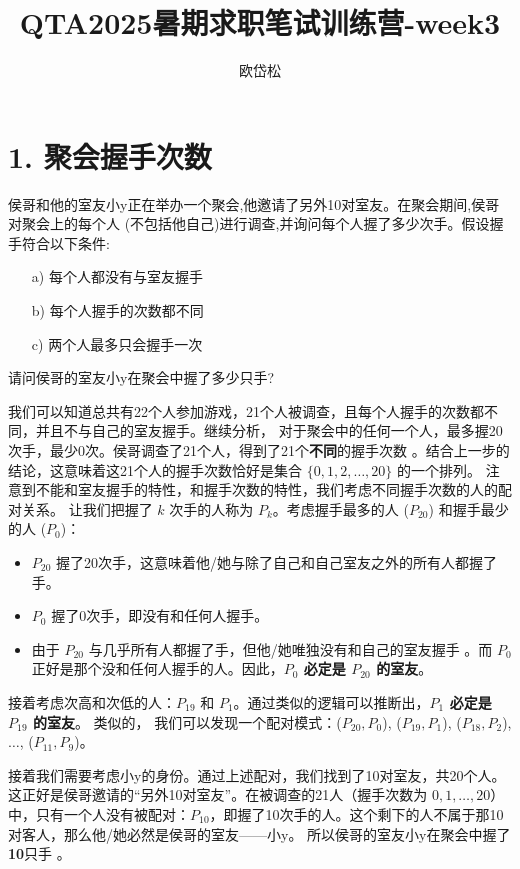 \documentclass[UTF8]{ctexart}
\title{QTA2025暑期求职笔试训练营-week3}
\author{欧岱松}
\date{}
\begin{document}
\maketitle
\section*{1. 聚会握手次数}

侯哥和他的室友小y正在举办一个聚会,他邀请了另外10对室友。在聚会期间,侯哥对聚会上的每个人 (不包括他自己)进行调查,并询问每个人握了多少次手。假设握手符合以下条件:
\begin{itemize}
    \item[a)] 每个人都没有与室友握手
    \item[b)] 每个人握手的次数都不同
    \item[c)] 两个人最多只会握手一次
\end{itemize}
请问侯哥的室友小y在聚会中握了多少只手?


我们可以知道总共有22个人参加游戏，21个人被调查，且每个人握手的次数都不同，并且不与自己的室友握手。继续分析，
对于聚会中的任何一个人，最多握20次手，最少0次。侯哥调查了21个人，得到了21个\textbf{不同}的握手次数 。结合上一步的结论，这意味着这21个人的握手次数恰好是集合 $\{0, 1, 2, \dots, 20\}$ 的一个排列。
注意到不能和室友握手的特性，和握手次数的特性，我们考虑不同握手次数的人的配对关系。
让我们把握了 $k$ 次手的人称为 $P_k$。考虑握手最多的人 ($P_{20}$) 和握手最少的人 ($P_0$)：
\begin{itemize}
            \item $P_{20}$ 握了20次手，这意味着他/她与除了自己和自己室友之外的所有人都握了手。
            \item $P_0$ 握了0次手，即没有和任何人握手。
            \item 由于 $P_{20}$ 与几乎所有人都握了手，但他/她唯独没有和自己的室友握手 。而 $P_0$ 正好是那个没和任何人握手的人。因此，\textbf{$P_0$ 必定是 $P_{20}$ 的室友}。
\end{itemize}

接着考虑次高和次低的人：$P_{19}$ 和 $P_1$。通过类似的逻辑可以推断出，\textbf{$P_1$ 必定是 $P_{19}$ 的室友}。
类似的， 我们可以发现一个配对模式：($P_{20}, P_0$), ($P_{19}, P_1$), ($P_{18}, P_2$), $\dots$, ($P_{11}, P_9$)。


接着我们需要考虑小y的身份。通过上述配对，我们找到了10对室友，共20个人。这正好是侯哥邀请的“另外10对室友”。在被调查的21人（握手次数为 $0, 1, \dots, 20$）中，只有一个人没有被配对：$P_{10}$，即握了10次手的人。这个剩下的人不属于那10对客人，那么他/她必然是侯哥的室友——小y。
所以侯哥的室友小y在聚会中握了\textbf{10}只手 。
\end{document}
